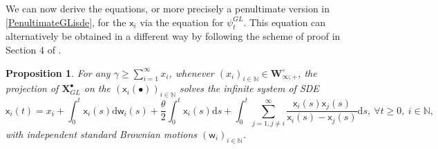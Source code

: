 \documentclass[]{article}
\newtheorem{prop}[thm]{Proposition}
\begin{document}
We can now derive the equations, or more precisely a penultimate version in \eqref{PenultimateGLisde}, for the $\mathsf{x}_i$ via the equation for $\psi_t^{GL}$. This equation can alternatively be obtained in a different way by following the scheme of proof in Section 4 of \cite{AM24}.

\begin{prop}\label{PropISDEGL}
For any $\gamma\ge \sum_{i=1}^\infty x_i$, whenever $(x_i)_{i\in \mathbb{N}}\in \mathbf{W}_{\infty;+}^\circ$, the projection of $\mathbf{X}_{GL}^\bullet$ on the $(\mathsf{x}_i(\bullet))_{i\in \mathbb{N}}$ solves the infinite system of SDE
\begin{equation*}
\mathsf{x}_i(t)= x_i+\int_0^t\mathsf{x}_i(s)\mathrm{d}\mathsf{w}_i(s) + \frac{\theta}{2}\int_0^t\mathsf{x}_i(s)\mathrm{d}s
 +\int_0^t\sum_{j=1,j\neq i}^{\infty}\frac{\mathsf{x}_i(s)\mathsf{x}_j(s)}{\mathsf{x}_i(s)-\mathsf{x}_j(s)}\mathrm{d}s, \  \forall t\ge 0 , \   i \in \mathbb{N},
 \end{equation*}
with independent standard Brownian motions $(\mathsf{w}_i)_{i\in \mathbb{N}}$.
\end{prop}
\end{document}
